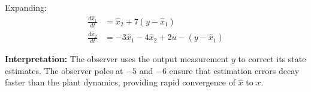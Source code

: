\documentclass[11pt,a4paper]{article}
\begin{document}
Expanding:
\begin{align}
\frac{d\hat{x}_1}{dt} &= \hat{x}_2 + 7(y - \hat{x}_1) \\
\frac{d\hat{x}_2}{dt} &= -3\hat{x}_1 - 4\hat{x}_2 + 2u - (y - \hat{x}_1)
\end{align}

\textbf{Interpretation:} The observer uses the output measurement $y$ to correct its state estimates. The observer poles at $-5$ and $-6$ ensure that estimation errors decay faster than the plant dynamics, providing rapid convergence of $\hat{x}$ to $x$.
\end{document}
